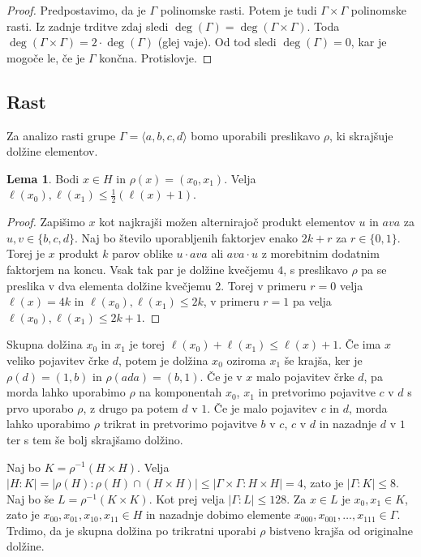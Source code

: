 \documentclass[11pt]{book}
\def\razstavi{\rho}
\def\literatura{\color{modra}}
\def\vaje{{\literatura (glej vaje)}}
\theoremstyle{definition}
\theoremstyle{zgled}
\theoremstyle{odprtproblem}
\theoremstyle{domacanaloga}
\newenvironment{dokaz}
    {\color{siva}\begin{proof}}
    {\end{proof}}
\theoremstyle{izrek}
\newtheorem*{lema}{Lema}
\begin{document}
\begin{dokaz}
Predpostavimo, da je $\Gamma$ polinomske rasti. Potem je tudi $\Gamma \times \Gamma$ polinomske rasti. Iz zadnje trditve zdaj sledi $\deg(\Gamma) = \deg(\Gamma \times \Gamma)$. Toda $\deg(\Gamma \times \Gamma) = 2 \cdot \deg(\Gamma)$ \vaje. Od tod sledi $\deg(\Gamma) = 0$, kar je mogoče le, če je $\Gamma$ končna. Protislovje.
\end{dokaz}

\subsection{Rast}

Za analizo rasti grupe $\Gamma = \langle a,b,c,d \rangle$ bomo uporabili preslikavo $\razstavi$, ki skrajšuje dolžine elementov.

\begin{lema}
Bodi $x \in H$ in $\razstavi(x) = (x_0, x_1)$. Velja $\ell(x_0), \ell(x_1) \leq \frac12 (\ell(x) + 1)$.
\end{lema}

\begin{dokaz}
Zapišimo $x$ kot najkrajši možen alternirajoč produkt elementov $u$ in $ava$ za $u,v \in \{ b,c,d \}$. Naj bo število uporabljenih faktorjev enako $2k+r$ za $r \in \{0, 1\}$. Torej je $x$ produkt $k$ parov oblike $u \cdot ava$ ali $ava \cdot u$ z morebitnim dodatnim faktorjem na koncu. Vsak tak par je dolžine kvečjemu $4$, s preslikavo $\razstavi$ pa se preslika v dva elementa dolžine kvečjemu $2$. Torej  v primeru $r = 0$ velja $\ell(x) = 4k$ in $\ell(x_0), \ell(x_1) \leq 2k$, v primeru $r = 1$ pa velja $\ell(x_0), \ell(x_1) \leq 2k+1$.
\end{dokaz}

Skupna dolžina $x_0$ in $x_1$ je torej $\ell(x_0) + \ell(x_1) \leq \ell(x) + 1$. Če ima $x$ veliko pojavitev črke $d$, potem je dolžina $x_0$ oziroma $x_1$ še krajša, ker je $\razstavi(d) = (1,b)$ in $\razstavi(ada) = (b,1)$. Če je v $x$ malo pojavitev črke $d$, pa morda lahko uporabimo $\razstavi$ na komponentah $x_0$, $x_1$ in pretvorimo pojavitve $c$ v $d$ s prvo uporabo $\razstavi$, z drugo pa potem $d$ v $1$. Če je malo pojavitev $c$ in $d$, morda lahko uporabimo $\razstavi$ trikrat in pretvorimo pojavitve $b$ v $c$, $c$ v $d$ in nazadnje $d$ v $1$ ter s tem še bolj skrajšamo dolžino.

Naj bo $K = \razstavi^{-1}(H \times H)$. Velja $|H : K| = |\razstavi(H) : \razstavi(H) \cap (H \times H)| \leq |\Gamma \times \Gamma : H \times H| = 4$, zato je $|\Gamma : K| \leq 8$. Naj bo še $L = \razstavi^{-1}(K \times K)$. Kot prej velja $|\Gamma : L| \leq 128$. Za $x \in L$ je $x_0, x_1 \in K$, zato je $x_{00}, x_{01}, x_{10}, x_{11} \in H$ in nazadnje dobimo elemente $x_{000}, x_{001}, \dots, x_{111} \in \Gamma$. Trdimo, da je skupna dolžina po trikratni uporabi $\razstavi$ bistveno krajša od originalne dolžine.
\end{document}
